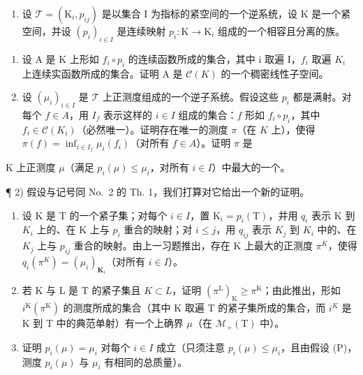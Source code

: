\exercisesection{}

\begin{enumerate}
\def\labelenumi{\arabic{enumi})}
\tightlist
\item
  设 \(\mathcal{T} = (\mathrm{K}_i, p_{ij})\) 是以集合 I 为指标的紧空间的一个逆系统，设 K 是一个紧空间，并设 \((p_i)_{i \in I}\) 是连续映射 \(p_i: \mathrm{K} \to \mathrm{K}_i\) 组成的一个相容且分离的族。
\end{enumerate}

\begin{enumerate}
\def\labelenumi{\alph{enumi})}
\item
  设 A 是 K 上形如 \(f_{i} \circ p_{i}\) 的连续函数所成的集合，其中 i 取遍 I，\(f_{i}\) 取遍 \(K_{i}\) 上连续实函数所成的集合。证明 A 是 \(\mathcal{C}(K)\) 的一个稠密线性子空间。
\item
  设 \((\mu_i)_{i \in I}\) 是 \(\mathcal{T}\) 上正测度组成的一个逆子系统。假设这些 \(p_i\) 都是满射。对每个 \(f \in A\)，用 \(I_f\) 表示这样的 \(i \in I\) 组成的集合：\(f\) 形如 \(f_i \circ p_i\)，其中 \(f_i \in \mathcal{C}(K_i)\)（必然唯一）。证明存在唯一的测度 \(\pi\)（在 \(K\) 上），使得 \(\pi(f) = \inf_{i \in I_f} \mu_i(f_i)\)（对所有 \(f \in A\)）。证明 \(\pi\) 是
\end{enumerate}

K 上正测度 \(\mu\)（满足 \(p_i(\mu) \leqslant \mu_i\)，对所有 \(i \in I\)）中最大的一个。

¶ 2) 假设与记号同 No.~2 的 Th. 1，我们打算对它给出一个新的证明。

\begin{enumerate}
\def\labelenumi{\alph{enumi})}
\item
  设 K 是 T 的一个紧子集；对每个 \(i \in I\)，置 \(\mathrm{K}_{i} = p_{i}(\mathrm{T})\)，并用 \(q_{i}\) 表示 K 到 \(K_{i}\) 上的、在 K 上与 \(p_{i}\) 重合的映射；对 \(i \leqslant j\)，用 \(q_{ij}\) 表示 \(K_{j}\) 到 \(K_{i}\) 中的、在 \(K_{j}\) 上与 \(p_{ij}\) 重合的映射。由上一习题推出，存在 K 上最大的正测度 \(\pi^{K}\)，使得 \(q_{i}(\pi^{K}) = (\mu_{i})_{\mathbf{K}_{i}}\)（对所有 \(i \in I\)）。
\item
  若 K 与 L 是 T 的紧子集且 \(K \subset L\)，证明 \((\pi^{\mathrm{L}})_{\mathrm{K}} \geqslant \pi^{\mathrm{K}}\)；由此推出，形如 \(i^{\mathrm{K}}(\pi^{\mathrm{K}})\) 的测度所成的集合（其中 K 取遍 T 的紧子集所成的集合，而 \(i^{K}\) 是 K 到 T 中的典范单射）有一个上确界 \(\mu\)（在 \(\mathcal{M}_{+}(\mathrm{T})\) 中）。
\item
  证明 \(p_i(\mu) = \mu_i\) 对每个 \(i \in I\) 成立（只须注意 \(p_i(\mu) \leqslant \mu_i\)，且由假设 (P)，测度 \(p_i(\mu)\) 与 \(\mu_i\) 有相同的总质量）。
\end{enumerate}

